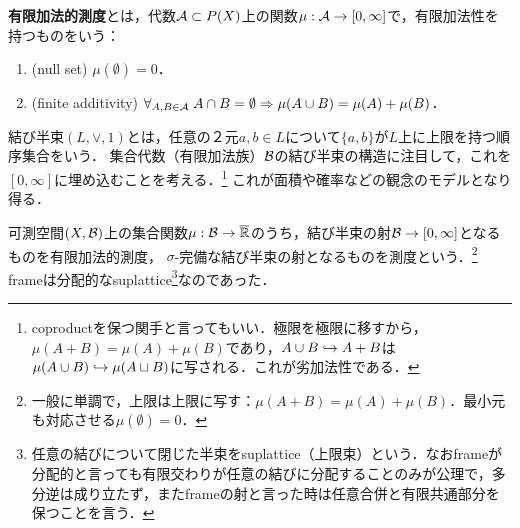 \documentclass[uplatex, dvipdfmx]{jsreport}
\begin{document}
\begin{definition}
    \textbf{有限加法的測度}とは，代数$\mathcal{A}\subset P(X)$上の関数$\mu:\mathcal{A}\to[0,\infty]$で，有限加法性を持つものをいう：
    \begin{enumerate}
        \item (null set) $\mu(\emptyset)=0$．
        \item (finite additivity) $\forall_{A,B\in\mathcal{A}}\;A\cap B=\emptyset\Rightarrow\mu(A\cup B)=\mu(A)+\mu(B)$．
    \end{enumerate}
\end{definition}
\begin{remarks}
    結び半束$(L,\lor,1)$とは，任意の２元$a,b\in L$について$\{a,b\}$が$L$上に上限を持つ順序集合をいう．
    集合代数（有限加法族）$\mathcal{B}$の結び半束の構造に注目して，これを$[0,\infty]$に埋め込むことを考える．\footnote{coproductを保つ関手と言ってもいい．極限を極限に移すから，$\mu(A+B)=\mu(A)+\mu(B)$であり，$A\cup B\hookrightarrow A+B$は$\mu(A\cup B)\hookrightarrow\mu(A\sqcup B)$に写される．これが劣加法性である．}
    これが面積や確率などの観念のモデルとなり得る．

    可測空間$(X,\mathcal{B})$上の集合関数$\mu:\mathcal{B}\to\overline{\mathbb{R}}$のうち，結び半束の射$\mathcal{B}\to[0,\infty]$となるものを有限加法的測度，
    $\sigma$-完備な結び半束の射となるものを測度という．\footnote{一般に単調で，上限は上限に写す：$\mu(A+B)=\mu(A)+\mu(B)$．最小元も対応させる$\mu(\emptyset)=0$．}
    frameは分配的なsuplattice\footnote{任意の結びについて閉じた半束をsuplattice（上限束）という．なおframeが分配的と言っても有限交わりが任意の結びに分配することのみが公理で，多分逆は成り立たず，またframeの射と言った時は任意合併と有限共通部分を保つことを言う．}なのであった．
\end{remarks}
\end{document}
